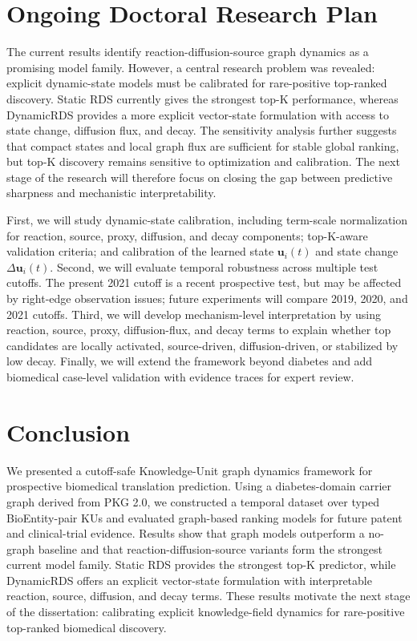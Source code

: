 \documentclass[conference]{IEEEtran}
\begin{document}
\section{Ongoing Doctoral Research Plan}

The current results identify reaction-diffusion-source graph dynamics as a promising model family. However, a central research problem was revealed: explicit dynamic-state models must be calibrated for rare-positive top-ranked discovery. Static RDS currently gives the strongest top-K performance, whereas DynamicRDS provides a more explicit vector-state formulation with access to state change, diffusion flux, and decay. The sensitivity analysis further suggests that compact states and local graph flux are sufficient for stable global ranking, but top-K discovery remains sensitive to optimization and calibration. The next stage of the research will therefore focus on closing the gap between predictive sharpness and mechanistic interpretability.

First, we will study dynamic-state calibration, including term-scale normalization for reaction, source, proxy, diffusion, and decay components; top-K-aware validation criteria; and calibration of the learned state $\mathbf{u}_i(t)$ and state change $\Delta\mathbf{u}_i(t)$. Second, we will evaluate temporal robustness across multiple test cutoffs. The present 2021 cutoff is a recent prospective test, but may be affected by right-edge observation issues; future experiments will compare 2019, 2020, and 2021 cutoffs. Third, we will develop mechanism-level interpretation by using reaction, source, proxy, diffusion-flux, and decay terms to explain whether top candidates are locally activated, source-driven, diffusion-driven, or stabilized by low decay. Finally, we will extend the framework beyond diabetes and add biomedical case-level validation with evidence traces for expert review.

\section{Conclusion}

We presented a cutoff-safe Knowledge-Unit graph dynamics framework for prospective biomedical translation prediction. Using a diabetes-domain carrier graph derived from PKG 2.0, we constructed a temporal dataset over typed BioEntity-pair KUs and evaluated graph-based ranking models for future patent and clinical-trial evidence. Results show that graph models outperform a no-graph baseline and that reaction-diffusion-source variants form the strongest current model family. Static RDS provides the strongest top-K predictor, while DynamicRDS offers an explicit vector-state formulation with interpretable reaction, source, diffusion, and decay terms. These results motivate the next stage of the dissertation: calibrating explicit knowledge-field dynamics for rare-positive top-ranked biomedical discovery.
\end{document}
